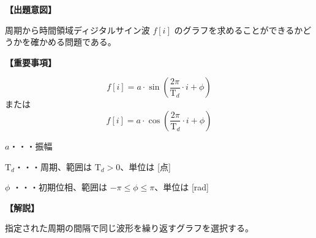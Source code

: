 \noindent \textbf{【出題意図】}

\noindent 周期から時間領域ディジタルサイン波 $f[i]$ のグラフを求めることができるかどうかを確かめる問題である。

\vspace{1em}
\noindent \textbf{【重要事項】}

\[
f[i] = a \cdot \sin \left ( \frac{2 \pi}{\textrm{T}_d}  \cdot i + \phi \right )
\]
%
\noindent または
%
\[
f[i] = a \cdot \cos \left ( \frac{2 \pi}{\textrm{T}_d}  \cdot i + \phi \right )
\]

\bigskip
\noindent $a$・・・振幅

\bigskip
\noindent $\textrm{T}_d$・・・周期、範囲は $\textrm{T}_d > 0$、単位は [点]

\bigskip
\noindent $\phi$ ・・・初期位相、範囲は $-\pi \leq \phi \leq \pi$、単位は [rad]


\vspace{1em}
\noindent \textbf{【解説】}

\noindent 指定された周期の間隔で同じ波形を繰り返すグラフを選択する。
